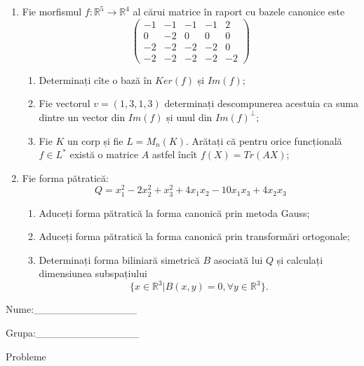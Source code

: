 \documentclass{article}
\begin{document}
\begin{enumerate}
 \item Fie morfismul $f:\mathbb{R}^5 \to \mathbb{R}^4$ al cărui matrice în raport cu bazele canonice este
$$\begin{pmatrix}
-1&-1&-1&-1&2\\
0&-2&0&0&0\\
-2&-2&-2&-2&0\\
-2&-2&-2&-2&-2
\end{pmatrix}$$

\begin{enumerate}
\item Determinați cîte o bază în $Ker(f)$ și $Im(f)$;
\item Fie vectorul $v=(1,3,1,3)$ determinați descompunerea acestuia ca suma dintre un vector din $Im(f)$ și unul din $Im(f)^\perp$;
\item Fie $K$ un corp și fie $L=M_n(K)$. Arătați că pentru orice funcțională $f \in L^*$ există o matrice $A$ astfel încît $f(X)=Tr(AX)$;
\end{enumerate}
\item Fie forma pătratică:
$$Q= x_1^2-2x_2^2+x_3^2+4x_1x_2-10x_1x_3+4x_2x_3$$

\begin{enumerate}
\item Aduceți forma pătratică la forma canonică prin metoda Gauss;
\item Aduceți forma pătratică la forma canonică prin transformări ortogonale;
\item Determinați forma biliniară simetrică $B$ asociată lui $Q$ și calculați dimensiunea subspațiului
$$\{x \in \mathbb{R}^3 | B(x,y)=0,\forall y \in \mathbb{R}^3\}.$$

\end{enumerate}
\end{enumerate}
\newpage
\begin{flushright}
Nume:\_\_\_\_\_\_\_\_\_\_\_\_\_\_
 
 
Grupa:\_\_\_\_\_\_\_\_\_\_\_\_\_\_
\end{flushright}
\begin{center}
\vspace{2cm}
{\Large Probleme}
\vspace{2cm}
\end{center}
\end{document}
